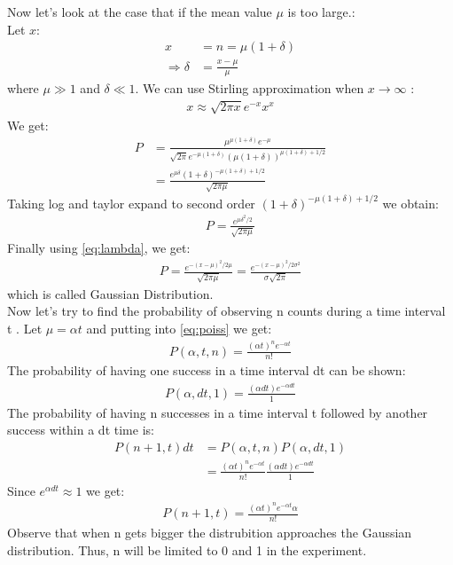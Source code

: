 \documentclass[reprint,amsmath,aps,nofootinbib,english]{revtex4-2}
\begin{document}
Now let's look at the case that if the mean value $\mu$ is too large.\cite{gauss}: \\
Let $x$:
\begin{align}
        x &= n = \mu (1+ \delta) \\
        \Rightarrow \delta &= \frac{x - \mu}{\mu} \label{eq:lambda}
\end{align}
where $\mu \gg 1$ and  $ \delta \ll 1$. We can use Stirling approximation when $ x \rightarrow \infty $ :
\begin{align}
        x \approx \sqrt{2 \pi x} e^{-x} x^x
\end{align}
We get:
\begin{align}
        P &= \frac{\mu^{\mu(1+\delta)}e^{-\mu}}{\sqrt {2\pi}  e^{-\mu(1+ \delta)} (\mu(1+\delta))^{ \mu (1+\delta) + 1/2} } \\
          &= \frac{e^{\mu \delta} ( 1 + \delta ) ^ { -\mu (1 + \delta ) +  1/2 }}{ \sqrt{2\pi \mu}}
\end{align}
Taking log and taylor expand to second order $ (1 + \delta ) ^ { -\mu (1 + \delta ) +  1/2 } $ we obtain:
\begin{align}
        P = \frac{e^{\mu \delta^2 /2}}{\sqrt{2 \pi \mu}}
\end{align}
Finally using \eqref{eq:lambda}, we get:
\begin{align}
        P = \frac{e^{- (x-\mu)^2 / 2\mu}}   { \sqrt{2 \pi \mu}} = \frac{e^{- (x-\mu)^2 / 2\sigma ^2}}   { \sigma \sqrt{2 \pi}}
\end{align}
which is called Gaussian Distribution. \\

Now let's try to find the probability of observing n counts during a time interval t \cite{Gulmez}. Let $\mu = \alpha t$ and putting into \eqref{eq:poiss} we get:
\begin{align}
P(\alpha, t, n) = \frac{(\alpha t)^n e^{-\alpha t}}{n!}
\end{align}
The probability of having one success in a time interval dt can be shown:
\begin{align}
P(\alpha, dt, 1) = \frac{(\alpha dt) e^{-\alpha dt}}{1}
\end{align}
The probability of having n successes in a time interval t followed by another success within a dt time is:
\begin{align}
        P(n+1, t) dt &= P(\alpha, t , n) P(\alpha, dt, 1) \\ 
                     &= \frac{(\alpha t)^n e^{-\alpha t}}{n!} \frac{(\alpha dt) e^{-\alpha dt}}{1} 
\end{align}
Since $e^{\alpha dt} \approx 1$ we get:
\begin{align}
        P(n+1,t) = \frac{(\alpha t)^n e^{-\alpha t} \alpha}{n!} \label{eq:time}
\end{align}
Observe that when n gets bigger the distrubition approaches the Gaussian distribution. Thus, n will be limited to 0 and 1 in the experiment.
\end{document}

